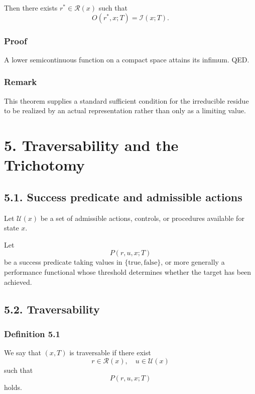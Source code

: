 \documentclass[
]{article}
\begin{document}
Then there exists \(r^\ast \in \mathcal{R}(x)\) such that \[
O(r^\ast,x;T) = \mathcal{I}(x;T).
\]

\subsubsection{Proof}\label{proof-3}

A lower semicontinuous function on a compact space attains its infimum.
QED.

\subsubsection{Remark}\label{remark}

This theorem supplies a standard sufficient condition for the
irreducible residue to be realized by an actual representation rather
than only as a limiting value.

\section{5. Traversability and the
Trichotomy}\label{traversability-and-the-trichotomy}

\subsection{5.1. Success predicate and admissible
actions}\label{success-predicate-and-admissible-actions}

Let \(\mathcal{U}(x)\) be a set of admissible actions, controls, or
procedures available for state \(x\).

Let \[
P(r,u,x;T)
\] be a success predicate taking values in
\(\{\text{true},\text{false}\}\), or more generally a performance
functional whose threshold determines whether the target has been
achieved.

\subsection{5.2. Traversability}\label{traversability}

\subsubsection{Definition 5.1}\label{definition-5.1}

We say that \((x,T)\) is traversable if there exist \[
r \in \mathcal{R}(x), \quad u \in \mathcal{U}(x)
\] such that \[
P(r,u,x;T)
\] holds.
\end{document}
